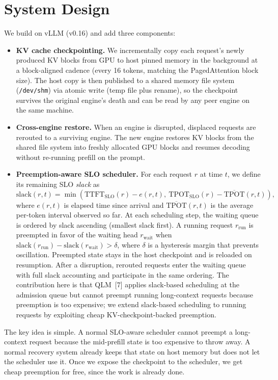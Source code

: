\documentclass[11pt]{article}
\begin{document}
\section*{System Design}
We build on vLLM (v0.16) and add three components:
\begin{itemize}
    \item \textbf{KV cache checkpointing.} We incrementally copy each request's newly produced KV blocks from GPU to host pinned memory in the background at a block-aligned cadence (every 16 tokens, matching the PagedAttention block size). The host copy is then published to a shared memory file system (\texttt{/dev/shm}) via atomic write (temp file plus rename), so the checkpoint survives the original engine's death and can be read by any peer engine on the same machine.
    \item \textbf{Cross-engine restore.} When an engine is disrupted, displaced requests are rerouted to a surviving engine. The new engine restores KV blocks from the shared file system into freshly allocated GPU blocks and resumes decoding without re-running prefill on the prompt.
    \item \textbf{Preemption-aware SLO scheduler.} For each request $r$ at time $t$, we define its remaining SLO \emph{slack} as
    \[
        \mathrm{slack}(r, t) = \min\!\left(\mathrm{TTFT}_{\mathrm{SLO}}(r) - e(r,t),\ \mathrm{TPOT}_{\mathrm{SLO}}(r) - \overline{\mathrm{TPOT}}(r,t)\right),
    \]
    where $e(r,t)$ is elapsed time since arrival and $\overline{\mathrm{TPOT}}(r,t)$ is the average per-token interval observed so far. At each scheduling step, the waiting queue is ordered by slack ascending (smallest slack first). A running request $r_{\mathrm{run}}$ is preempted in favor of the waiting head $r_{\mathrm{wait}}$ when $\mathrm{slack}(r_{\mathrm{run}}) - \mathrm{slack}(r_{\mathrm{wait}}) > \delta$, where $\delta$ is a hysteresis margin that prevents oscillation. Preempted state stays in the host checkpoint and is reloaded on resumption. After a disruption, rerouted requests enter the waiting queue with full slack accounting and participate in the same ordering. The contribution here is that QLM~[7] applies slack-based scheduling at the admission queue but cannot preempt running long-context requests because preemption is too expensive; we extend slack-based scheduling to running requests by exploiting cheap KV-checkpoint-backed preemption.
\end{itemize}
The key idea is simple. A normal SLO-aware scheduler cannot preempt a long-context request because the mid-prefill state is too expensive to throw away. A normal recovery system already keeps that state on host memory but does not let the scheduler use it. Once we expose the checkpoint to the scheduler, we get cheap preemption for free, since the work is already done.
 
\end{document}
